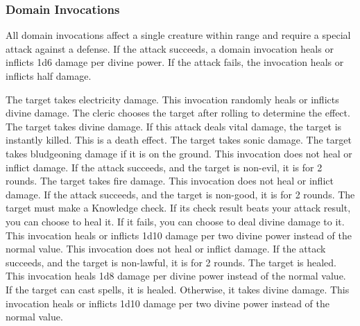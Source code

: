         \subsubsection{Domain Invocations}\label{Domain Invocations}
            All domain invocations affect a single creature within \rngmed range and require a special attack against a defense.
            If the attack succeeds, a domain invocation heals or inflicts 1d6 damage per divine power.
            If the attack fails, the invocation heals or inflicts half damage.

            The target takes electricity damage.
            This invocation randomly heals or inflicts divine damage.
            The cleric chooses the target after rolling to determine the effect.
            The target takes divine damage.
            If this attack deals vital damage, the target is instantly killed.
            This is a death effect.
            The target takes sonic damage.
            The target takes bludgeoning damage if it is on the ground.
            This invocation does not heal or inflict damage.
            If the attack succeeds, and the target is non-evil, it is \staggered for 2 rounds.
            The target takes fire damage.
            This invocation does not heal or inflict damage.
            If the attack succeeds, and the target is non-good, it is \dazed for 2 rounds.
            The target must make a Knowledge check.
            If its check result beats your attack result, you can choose to heal it.
            If it fails, you can choose to deal divine damage to it.
            This invocation heals or inflicts 1d10 damage per two divine power instead of the normal value.
            This invocation does not heal or inflict damage.
            If the attack succeeds, and the target is non-lawful, it is \immobilized for 2 rounds.
            The target is healed.
            This invocation heals 1d8 damage per divine power instead of the normal value.
            If the target can cast spells, it is healed.
            Otherwise, it takes divine damage.
            This invocation heals or inflicts 1d10 damage per two divine power instead of the normal value.
